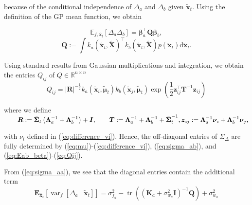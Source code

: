 because of the conditional independence of $\Delta_a$ and $\Delta_b$ given $\tilde{\boldsymbol{x}}_t$. Using the definition of the GP mean function, we obtain

\begin{equation}\label{eq:Eab_beta}
    \mathbb{E}_{f, \overline{\boldsymbol{x}}_t}\left[\Delta_a \Delta_b\right]=\boldsymbol{\beta}_a^{\top} \boldsymbol{Q} \boldsymbol{\beta}_b,
\end{equation}
\begin{equation}\label{eq:Q_integral}
    \boldsymbol{Q}:=\int k_a\left(\tilde{\boldsymbol{x}}_t, \tilde{\boldsymbol{X}}\right)^{\top} k_b\left(\tilde{\boldsymbol{x}}_t, \tilde{\boldsymbol{X}}\right) p\left(\tilde{\boldsymbol{x}}_t\right) \mathrm{d} \tilde{\boldsymbol{x}}_t .
\end{equation}

Using standard results from Gaussian multiplications and integration, we obtain the entries $Q_{i j}$ of $Q \in \mathbb{R}^{n \times n}$
\begin{equation}\label{eq:Qij}
    Q_{i j}=|\boldsymbol{R}|^{-\frac{1}{2}} k_a\left(\tilde{\boldsymbol{x}}_i, \tilde{\boldsymbol{\mu}}_t\right) k_b\left(\tilde{\boldsymbol{x}}_j, \tilde{\boldsymbol{\mu}}_t\right) \exp \left(\frac{1}{2} \boldsymbol{z}_{i j}^{\top} \boldsymbol{T}^{-1} \boldsymbol{z}_{i j}\right)
\end{equation}

where we define
$\qquad \boldsymbol{R}  :=\tilde{\boldsymbol{\Sigma}}_t\left(\boldsymbol{\Lambda}_a^{-1}+\boldsymbol{\Lambda}_b^{-1}\right)+\boldsymbol{I}, \qquad \boldsymbol{T}:=\boldsymbol{\Lambda}_a^{-1}+\boldsymbol{\Lambda}_b^{-1}+\tilde{\boldsymbol{\Sigma}}_t^{-1}, \\ \boldsymbol{z}_{i j} :=\boldsymbol{\Lambda}_a^{-1} \boldsymbol{\nu}_i+\boldsymbol{\Lambda}_b^{-1} \boldsymbol{\nu}_j,$


with $\nu_i$ defined in (\ref{eq:difference_vi}). Hence, the off-diagonal entries of $\Sigma_{\Delta}$ are fully determined by (\ref{eq:mu})-(\ref{eq:difference_vi}), (\ref{eq:sigma_ab}), and (\ref{eq:Eab_beta})-(\ref{eq:Qij}).

From (\ref{eq:sigma_aa}), we see that the diagonal entries contain the additional term
\begin{equation}\label{eq:E_xa}
    \mathbf{E}_{\overline{\boldsymbol{x}}_t}\left[\operatorname{var}_f\left[\Delta_a \mid \tilde{\boldsymbol{x}}_t\right]\right]=\sigma_{f_a}^2-\operatorname{tr}\left(\left(\boldsymbol{K}_a+\sigma_{w_a}^2 \boldsymbol{I}\right)^{-1} \boldsymbol{Q}\right)+\sigma_{w_a}^2
\end{equation}

